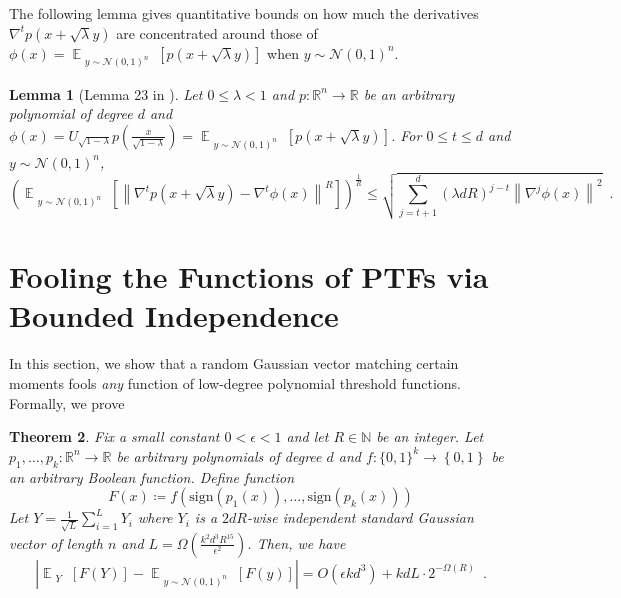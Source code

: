 \documentclass[12pt]{article}
\newtheorem{theorem}{Theorem}[section]
\newtheorem{lemma}[theorem]{Lemma}
\newcommand{\N}{\mathbb{N}}  \newcommand{\R}{\mathbb{R}} \newcommand{\C}{\mathbb{C}} \newcommand{\U}{\mathbb{U}} \renewcommand{\d}{\mathrm{d}} \DeclareMathOperator*{\E}{\mathbb{E}}  \newcommand{\so}{\mathrm{SO}} \newcommand{\s}{\mathrm{S}} \newcommand{\su}{\mathrm{SU}} \renewcommand{\i}{\mathrm{i}} \newcommand{\A}{\mathcal{A}}  \newcommand{\B}{\mathcal{B}} \newcommand{\CC}{\mathcal{C}} \newcommand{\D}{\mathcal{D}} \newcommand{\F}{\mathcal{F}} \renewcommand{\H}{\mathcal{H}} \newcommand{\K}{\mathcal{K}} \newcommand{\NN}{\mathcal{N}} \newcommand{\V}{\mathcal{V}} \newcommand{\X}{\mathcal{X}} \newcommand{\Y}{\mathcal{Y}} \renewcommand{\S}{\mathcal{S}} \newcommand{\SR}{\mathcal{S}_{\R}} \newcommand{\SC}{\mathcal{S}_{\C}} \newcommand{\EE}{\mathcal{E}}  \newcommand{\PP}{\mathcal{P}} \newcommand{\KK}{\widetilde{K}} \newcommand{\LL}{\widetilde{L}} \newcommand{\W}{\widehat{W}} \newcommand{\f}{\hat{f}} \newcommand{\g}{\hat{g}} \newcommand{\h}{\hat{h}} \newcommand{\bit}[1]{\{0,1\}^{#1}} \newcommand{\wrt}{w.r.t.~} \newcommand{\us}{\overset{\$}{\leftarrow}} \newcommand{\set}[1]{\left\{#1\right\}} \newcommand{\lhs}{\mathrm{LHS}} \newcommand{\expec}[1]{\E\!\Br{#1}} \newcommand{\expect}[2]{\E_{\substack{#1}}\!\Br{#2}} \newcommand{\prob}[2]{\underset{#1}{\mathrm{Pr}}\!\Br{#2}} \newcommand{\cf}{\widetilde{f}} \newcommand{\cg}{\widetilde{g}} \newcommand{\ch}{\widetilde{h}} \newcommand{\ck}{\widetilde{K}} \newcommand{\rep}[2]{\br{#1}_{#2}} \newcommand{\AND}[1]{\mathrm{AND}\!\br{#1}}
\newcommand{\sign}[1]{\mathrm{sign}\!\br{#1}}
\newcommand{\grad}[2]{\nabla^{#1}{#2}}
\newcommand{\br}[1]{\left(#1\right)} \newcommand{\Br}[1]{\left[#1\right]} \newcommand{\st}[1]{\left\{#1\right\}} \newcommand{\tr}[1]{\mathrm{Tr}\!\Br{#1}} \newcommand{\abs}[1]{\left|#1 \right|} \newcommand{\norm}[1]{\left\lVert #1 \right\rVert} \newcommand{\agl}[2]{\theta^{\br{#1}}_{#2}} \newcommand{\aglp}[2]{{\theta'}^{\br{#1}}_{#2}} \newcommand{\lint}[1]{\left\lfloor#1\right\rfloor} \newcommand{\poly}[1]{\mathrm{poly}\!\br{#1}} \newcommand{\negl}[1]{\mathrm{negl}\!\br{#1}} \newcommand{\de}[1]{\mathrm{d}#1} \newcommand{\val}[1]{\mathrm{val}\!\br{#1}} \newcommand{\vall}[1]{\mathrm{val}\br{#1}} \newcommand{\nd}[1]{\mathcal{N}\!\br{#1}} \newcommand{\ketbratwo}[2]{\ket{#1} \hspace{-0.4em}\bra{#2}} \newcommand{\ketbra}[1]{\ketbratwo{#1}{#1}} \newcommand{\id}{\ensuremath{\mathds{1}}} \newcommand{\ogroup}[1]{\mathrm{O}\!\br{#1}} \newcommand{\ugroup}[1]{\mathrm{U}\!\br{#1}} \newcommand{\td}{\mathrm{TD}} \newcommand{\tv}[1]{\norm{#1}_{\mathrm{TV}}} \newcommand {\defeq} {\ensuremath{ \stackrel{\mathrm{def}}{=} }} \newcommand{\vdim}{\ensuremath{N}} \newcommand{\dimin}{\ensuremath{n}} \newcommand{\dimout}{\ensuremath{m}} \newcommand{\ncopy}{\ell} \newcommand{\hspacein}{\H_\mathrm{in}} \newcommand{\hspaceout}{\H_\mathrm{out}} \newcommand{\Sin}{\S(\hspacein)} \newcommand{\Sout}{\S(\hspaceout)} \newcommand{\haar}{\ensuremath{\mu}} \newcommand{\tensorhaar}{\ensuremath{\eta}} \newcommand{\tensorsrss}{\ensuremath{\nu}} \newcommand{\qadvice}{\ensuremath{\rho}} \newcommand{\tp}{\otimes} \newcommand{\wone}[2]{W_1\!\br{#1,#2}}
\begin{document}
The following lemma gives quantitative bounds on how much
the derivatives $\grad{t}{p(x+\sqrt{\lambda}y)}$ are concentrated around those of $\phi(x) =\expect{y\sim \NN(0,1)^n}{p(x+\sqrt{\lambda} y)}$ when $y\sim \NN(0,1)^n$.

\begin{lemma}[Lemma 23 in \cite{KM22}]\label{lem:concentrate}
	Let $0\leq \lambda<1$ and $p:\R^n \to \R$ be an arbitrary polynomial of degree $d$ and $\phi(x) = U_{\sqrt{1-\lambda}} p\!\br{\frac{x}{\sqrt{1-\lambda}}}=\expect{y\sim \NN(0,1)^n}{p(x+\sqrt{\lambda} y)}$. For $0\leq t\leq d$ and $y\sim\NN\br{0,1}^n$,
	\[
	\br{\expect{y\sim\NN\br{0,1}^n}{\norm{ \grad{t}{p(x+\sqrt{\lambda}y)} - \grad{t}{\phi(x)}}^R}}^{\frac{1}{R}} \leq
	\sqrt{ \sum_{j=t+1}^d (\lambda dR)^{j-t} \norm{ \grad{j}{\phi(x)}}^2 } \enspace.
	\]
\end{lemma} 

\section{Fooling the Functions of PTFs via Bounded Independence}
\label{sec:fool}
In this section, we show that a random Gaussian vector matching certain moments fools \emph{any} function of low-degree polynomial threshold functions. Formally, we prove
\begin{theorem}\label{thm:cont}
	Fix a small constant $0<\epsilon<1$ and let $R\in\N$ be an integer. Let $p_1,\dots,p_k:\R^n \to \R$ be arbitrary polynomials of degree $d$ and $f:\bit{k}\to\st{0,1}$ be an arbitrary Boolean function.
	Define function
	\[
		F(x)\coloneqq f\!\br{\sign{p_1\!(x)},\dots,\sign{p_k\!(x)}}
	\]
	Let $Y = \frac{1}{\sqrt{L}} \sum_{i=1}^{L} Y_i $ where $Y_i$ is
	 a $2dR$-wise independent standard Gaussian vector of length $n$ and $L=\Omega\br{\frac{k^{2}d^{3}R^{15}}{\epsilon^2}}$. Then, we have
	\[
	\abs{
		\expect{Y}{
			F(Y)	
		}
		-
		\expect{y\sim\NN\br{0,1}^n}{
			F(y)
		}
	} = O(\epsilon kd^3) + kdL\cdot2^{-\Omega(R)} \enspace .
	\]
	\end{theorem}
\end{document}

